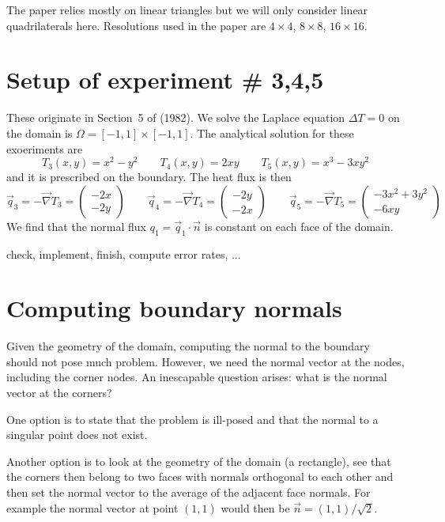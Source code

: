 The paper relies mostly on linear triangles but we will only consider 
linear quadrilaterals here.
Resolutions used in the paper are $4\times 4$, $8\times 8$, $16\times 16$.

\section*{Setup of experiment \# 3,4,5}

These originate in Section~5 of \textcite{care82} (1982).
We solve the Laplace equation $\Delta T=0$ on the domain is $\Omega=[-1,1]\times [-1,1]$.
The analytical solution for these exoeriments are 
\[
T_3(x,y)=x^2-y^2
\qquad
T_4(x,y)=2xy
\qquad
T_5(x,y)=x^3-3xy^2
\]
and it is prescribed on the boundary. The heat flux is then
\[
\vec{q}_3 
= -\vec\nabla T_3
= \left(\begin{array}{c}
-2x \\ -2y
\end{array}\right)
\qquad
\vec{q}_4
= -\vec\nabla T_4
= \left(\begin{array}{c}
-2y \\ -2x
\end{array}\right)
\qquad
\vec{q}_5
= -\vec\nabla T_5
= \left(\begin{array}{c}
-3x^2+3y^2 \\ -6xy
\end{array}\right)
\]
We find that the normal flux $q_1=\vec{q}_1\cdot\vec{n}$ is constant on each face 
of the domain.


{\color{red} check, implement, finish, compute error rates, ...}





\section*{Computing boundary normals}

Given the geometry of the domain, computing the normal to the boundary 
should not pose much problem. However, we need the normal vector at the nodes,
including the corner nodes. An inescapable question arises: 
what is the normal vector at the corners?

One option is to state that the problem is ill-posed and that the normal to a
singular point does not exist.

Another option is to look at the geometry of the domain (a rectangle), see that 
the corners then belong to two faces with normals orthogonal to each other 
and then set the normal vector to the average of the adjacent face normals.
For example the normal vector at point $(1,1)$ would then be $\vec{n}=(1,1)/\sqrt{2}$.

